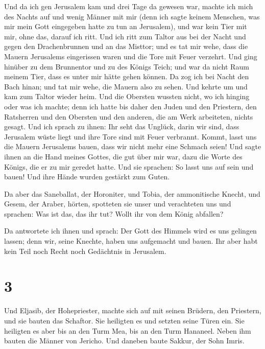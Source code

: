  Und da ich gen Jerusalem kam und drei Tage da gewesen
war,  machte ich mich des Nachts auf und wenig Männer mit
mir (denn ich sagte keinem Menschen, was mir mein Gott eingegeben hatte
zu tun an Jerusalem), und war kein Tier mit mir, ohne das, darauf ich
ritt.  Und ich ritt zum Taltor aus bei der Nacht und
gegen den Drachenbrunnen und an das Misttor; und es tat mir wehe, dass
die Mauern Jerusalems eingerissen waren und die Tore mit Feuer verzehrt.
 Und ging hinüber zu dem Brunnentor und zu des Königs
Teich; und war da nicht Raum meinem Tier, dass es unter mir hätte gehen
können.  Da zog ich bei Nacht den Bach hinan; und tat mir
wehe, die Mauern also zu sehen. Und kehrte um und kam zum Taltor wieder
heim.  Und die Obersten wussten nicht, wo ich hinging
oder was ich machte; denn ich hatte bis daher den Juden und den
Priestern, den Ratsherren und den Obersten und den anderen, die am Werk
arbeiteten, nichts gesagt.  Und ich sprach zu ihnen: Ihr
seht das Unglück, darin wir sind, dass Jerusalem wüste liegt und ihre
Tore sind mit Feuer verbrannt. Kommt, lasst uns die Mauern Jerusalems
bauen, dass wir nicht mehr eine Schmach seien!  Und sagte
ihnen an die Hand meines Gottes, die gut über mir war, dazu die Worte
des Königs, die er zu mir geredet hatte. Und sie sprachen: So lasst uns
auf sein und bauen! Und ihre Hände wurden gestärkt zum Guten.

 Da aber das Saneballat, der Horoniter, und Tobia, der
ammonitische Knecht, und Gesem, der Araber, hörten, spotteten sie unser
und verachteten uns und sprachen: Was ist das, das ihr tut? Wollt ihr
von dem König abfallen?

 Da antwortete ich ihnen und sprach: Der Gott des Himmels
wird es uns gelingen lassen; denn wir, seine Knechte, haben uns
aufgemacht und bauen. Ihr aber habt kein Teil noch Recht noch Gedächtnis
in Jerusalem.

\hypertarget{section-2}{%
\section{3}\label{section-2}}

 Und Eljasib, der Hohepriester, machte sich auf mit seinen
Brüdern, den Priestern, und sie bauten das Schaftor. Sie heiligten es
und setzten seine Türen ein. Sie heiligten es aber bis an den Turm Mea,
bis an den Turm Hananeel.  Neben ihm bauten die Männer von
Jericho. Und daneben baute Sakkur, der Sohn Imris.

